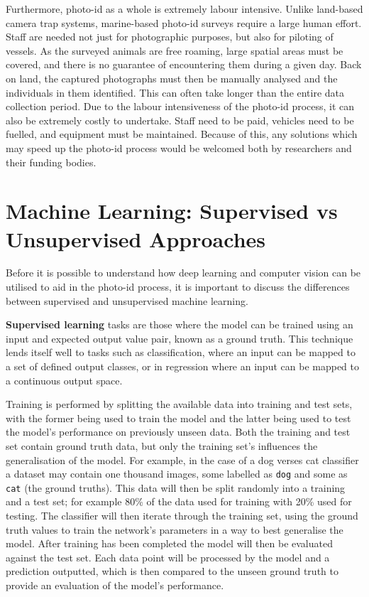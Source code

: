 Furthermore, photo-id as a whole is extremely labour intensive. Unlike land-based camera trap systems, marine-based photo-id surveys require a large human effort. Staff are needed not just for photographic purposes, but also for piloting of vessels. As the surveyed animals are free roaming, large spatial areas must be covered, and there is no guarantee of encountering them during a given day. Back on land, the captured photographs must then be manually analysed and the individuals in them identified. This can often take longer than the entire data collection period. Due to the labour intensiveness of the photo-id process, it can also be extremely costly to undertake. Staff need to be paid, vehicles need to be fuelled, and equipment must be maintained. Because of this, any solutions which may speed up the photo-id process would be welcomed both by researchers and their funding bodies. 

\section{Machine Learning: Supervised vs Unsupervised Approaches}\label{ch:Background,sec:DLIntro,sub:supervisedVsUnsupervisedLearning}

Before it is possible to understand how deep learning and computer vision can be utilised to aid in the photo-id process, it is important to discuss the differences between supervised and unsupervised machine learning.

\textbf{Supervised learning} tasks are those where the model can be trained using an input and expected output value pair, known as a ground truth. This technique lends itself well to tasks such as classification, where an input can be mapped to a set of defined output classes, or in regression where an input can be mapped to a continuous output space. 

Training is performed by splitting the available data into training and test sets, with the former being used to train the model and the latter being used to test the model's performance on previously unseen data. Both the training and test set contain ground truth data, but only the training set's influences the generalisation of the model. For example, in the case of a dog verses cat classifier a dataset may contain one thousand images, some labelled as \texttt{dog} and some as \texttt{cat} (the ground truths). This data will then be split randomly into a training and a test set; for example 80\% of the data used for training with 20\% used for testing. The classifier will then iterate through the training set, using the ground truth values to train the network's parameters in a way to best generalise the model. After training has been completed the model will then be evaluated against the test set. Each data point will be processed by the model and a prediction outputted, which is then compared to the unseen ground truth to provide an evaluation of the model's performance.

